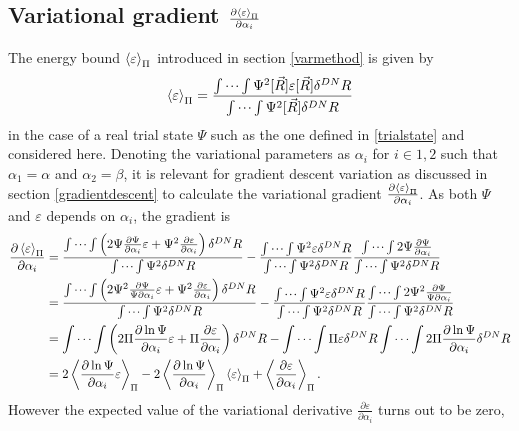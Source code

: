 \documentclass[a4paper,8pt]{article}
\begin{document}
\subsection{Variational gradient $\frac{\partial\ev{\varepsilon}_\Pi}{\partial\alpha_i}$} \label{vargrad}
The energy bound $\ev{\varepsilon}_\Pi$ introduced in section \ref{varmethod} is given by
\begin{equation}
\ev{\varepsilon}_\Pi = \frac{\idotsint \Psi^2[\vec{R}] \varepsilon[\vec{R}] \delta^{DN}R}{\idotsint \Psi^2[\vec{R}]\delta^{DN}R} \label{energybound}
\end{equation}
in the case of a real trial state $\Psi$ such as the one defined in \eqref{trialstate} and considered here. Denoting the variational parameters as $\alpha_i$ for $i \in {1,2}$ such that $\alpha_1 = \alpha$ and $\alpha_2 = \beta$, it is relevant for gradient descent variation as discussed in section \ref{gradientdescent} to calculate the variational gradient $\frac{\partial \ev{\varepsilon}_\Pi}{\partial \alpha_i}$. As both $\Psi$ and $\varepsilon$ depends on $\alpha_i$, the gradient is
\begin{align}
\frac{\partial\ev{\varepsilon}_\Pi}{\partial\alpha_i} &= \frac{\idotsint \left(2\Psi\frac{\partial\Psi}{\partial\alpha_i}\varepsilon+\Psi^2\frac{\partial\varepsilon}{\partial\alpha_i}\right)\delta^{DN}R}{\idotsint \Psi^2 \delta^{DN}R} - \frac{\idotsint \Psi^2\varepsilon \delta^{DN}R}{\idotsint \Psi^2 \delta^{DN}R}\frac{\idotsint 2\Psi\frac{\partial\Psi}{\partial\alpha_i}}{\idotsint \Psi^2 \delta^{DN}R} \nonumber\\
&= \frac{\idotsint \left(2\Psi^2\frac{\partial\Psi}{\Psi\partial\alpha_i}\varepsilon+\Psi^2\frac{\partial\varepsilon}{\partial\alpha_i}\right)\delta^{DN}R}{\idotsint \Psi^2 \delta^{DN}R} - \frac{\idotsint \Psi^2\varepsilon \delta^{DN}R}{\idotsint \Psi^2 \delta^{DN}R}\frac{\idotsint 2\Psi^2\frac{\partial\Psi}{\Psi\partial\alpha_i}}{\idotsint \Psi^2 \delta^{DN}R} \nonumber\\
&= \idotsint \left(2\Pi\frac{\partial\ln\Psi}{\partial\alpha_i}\varepsilon+\Pi\frac{\partial\varepsilon}{\partial\alpha_i}\right)\delta^{DN}R - \idotsint \Pi\varepsilon \delta^{DN}R \idotsint 2\Pi\frac{\partial\ln\Psi}{\partial\alpha_i} \delta^{DN}R \nonumber\\
&= 2\ev{\frac{\partial\ln\Psi}{\partial\alpha_i}\varepsilon}_\Pi-2\ev{\frac{\partial\ln\Psi}{\partial\alpha_i}}_\Pi\ev{\varepsilon}_\Pi+\ev{\frac{\partial\varepsilon}{\partial\alpha_i}}_\Pi. \nonumber
\end{align}
However the expected value of the variational derivative $\frac{\partial\varepsilon}{\partial\alpha_i}$ turns out to be zero,
\end{document}

